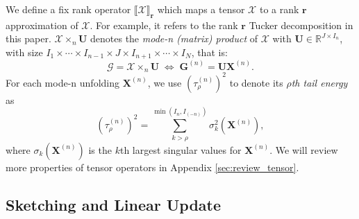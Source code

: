 We define a fix rank operator $\llbracket \mathscr{X} \rrbracket_\mathbf{r}$ which maps a tensor $\mathscr{X}$ to a rank $\mathbf{r}$ approximation of $\mathscr{X}$. For example,  it refers to the rank $\mathbf{r}$ Tucker decomposition in this paper.
$\mathscr{X} \times_n \mathbf{U}$ denotes the \textit{mode-n (matrix) product} of $\mathscr{X}$ with $\mathbf{U} \in \mathbb{R}^{J \times I_n}$, with size $I_1 \times \cdots \times I_{n-1} \times J \times I_{n+1} \times \cdots \times I_N$, that is: 
\begin{equation}
\mathscr{G} = \mathscr{X} \times_n \mathbf{U} \; \iff \; \mathbf{G}^{(n)} = \mathbf{U}\mathbf{X}^{(n)}.
\end{equation}
For each mode-n unfolding $\mathbf{X}^{(n)}$, we use $(\tau_\rho^{(n)})^2$ to denote its $\rho$\textit{th tail energy} as
\begin{equation}
(\tau_\rho^{(n)})^2 = \sum_{k>\rho}^{\min(I_n,I_{(-n)})} \sigma_{k}^2(\mathbf{X}^{(n)}), 
\end{equation}
where $\sigma_{k}(\mathbf{X}^{(n)})$ is the $k$th largest singular values for $\mathbf{X}^{(n)}$. We will review more properties of tensor operators in Appendix \ref{sec:review_tensor}. 


\subsection{Sketching and Linear Update} 





